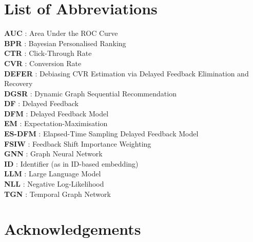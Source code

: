 \documentclass[12pt]{report}
\numberwithin{figure}{chapter}
\numberwithin{table}{chapter}
\numberwithin{equation}{chapter}
\begin{document}
\newpage
\tableofcontents
\thispagestyle{fancy}

\newpage
\listoffigures
\thispagestyle{fancy}

\newpage
\listoftables
\thispagestyle{fancy}

\chapter*{List of Abbreviations}
\thispagestyle{fancy}

\textbf{AUC} : Area Under the ROC Curve \\
\textbf{BPR} : Bayesian Personalised Ranking \\
\textbf{CTR} : Click-Through Rate \\
\textbf{CVR} : Conversion Rate \\
\textbf{DEFER} : Debiasing CVR Estimation via Delayed Feedback Elimination and Recovery \\
\textbf{DGSR} : Dynamic Graph Sequential Recommendation \\
\textbf{DF}   : Delayed Feedback \\
\textbf{DFM}  : Delayed Feedback Model \\
\textbf{EM}   : Expectation-Maximisation \\
\textbf{ES-DFM} : Elapsed-Time Sampling Delayed Feedback Model \\
\textbf{FSIW} : Feedback Shift Importance Weighting \\
\textbf{GNN}  : Graph Neural Network \\
\textbf{ID}   : Identifier (as in ID-based embedding) \\
\textbf{LLM}  : Large Language Model \\
\textbf{NLL}  : Negative Log-Likelihood \\
\textbf{TGN}  : Temporal Graph Network \\

\chapter*{Acknowledgements}
\thispagestyle{fancy}
\end{document}
